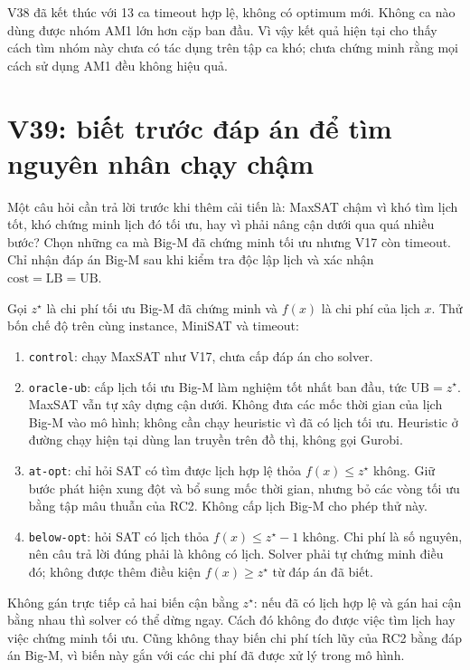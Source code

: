 \documentclass[11pt,a4paper]{article}
\newcommand{\code}[1]{\texttt{#1}}
\begin{document}
V38 đã kết thúc với 13 ca timeout hợp lệ, không có optimum mới. Không ca
nào dùng được nhóm AM1 lớn hơn cặp ban đầu. Vì vậy kết quả hiện tại cho
thấy cách tìm nhóm này chưa có tác dụng trên tập ca khó; chưa chứng minh
rằng mọi cách sử dụng AM1 đều không hiệu quả.

\section{V39: biết trước đáp án để tìm nguyên nhân chạy chậm}

Một câu hỏi cần trả lời trước khi thêm cải tiến là: MaxSAT chậm vì khó
tìm lịch tốt, khó chứng minh lịch đó tối ưu, hay vì phải nâng cận dưới
qua quá nhiều bước? Chọn những ca mà Big-M đã chứng minh tối ưu nhưng
V17 còn timeout. Chỉ nhận đáp án Big-M sau khi kiểm tra độc lập lịch và
xác nhận $\mathrm{cost}=\mathrm{LB}=\mathrm{UB}$.

Gọi $z^\star$ là chi phí tối ưu Big-M đã chứng minh và $f(x)$ là chi phí
của lịch $x$. Thử bốn chế độ trên cùng instance, MiniSAT và timeout:
\begin{enumerate}
\item \code{control}: chạy MaxSAT như V17, chưa cấp đáp án cho solver.
\item \code{oracle-ub}: cấp lịch tối ưu Big-M làm nghiệm tốt nhất ban đầu,
      tức $\mathrm{UB}=z^\star$. MaxSAT vẫn tự xây dựng cận dưới. Không
      đưa các mốc thời gian của lịch Big-M vào mô hình; không cần chạy
      heuristic vì đã có lịch tối ưu. Heuristic ở đường chạy hiện tại
      dùng lan truyền trên đồ thị, không gọi Gurobi.
\item \code{at-opt}: chỉ hỏi SAT có tìm được lịch hợp lệ thỏa
      $f(x)\le z^\star$ không. Giữ bước phát hiện xung đột và bổ sung
      mốc thời gian, nhưng bỏ các vòng tối ưu bằng tập mâu thuẫn của RC2.
      Không cấp lịch Big-M cho phép thử này.
\item \code{below-opt}: hỏi SAT có lịch thỏa $f(x)\le z^\star-1$ không.
      Chi phí là số nguyên, nên câu trả lời đúng phải là không có lịch.
      Solver phải tự chứng minh điều đó; không được thêm điều kiện
      $f(x)\ge z^\star$ từ đáp án đã biết.
\end{enumerate}

Không gán trực tiếp cả hai biến cận bằng $z^\star$: nếu đã có lịch hợp lệ
và gán hai cận bằng nhau thì solver có thể dừng ngay. Cách đó không đo
được việc tìm lịch hay việc chứng minh tối ưu. Cũng không thay biến chi
phí tích lũy của RC2 bằng đáp án Big-M, vì biến này gắn với các chi phí
đã được xử lý trong mô hình.
\end{document}

